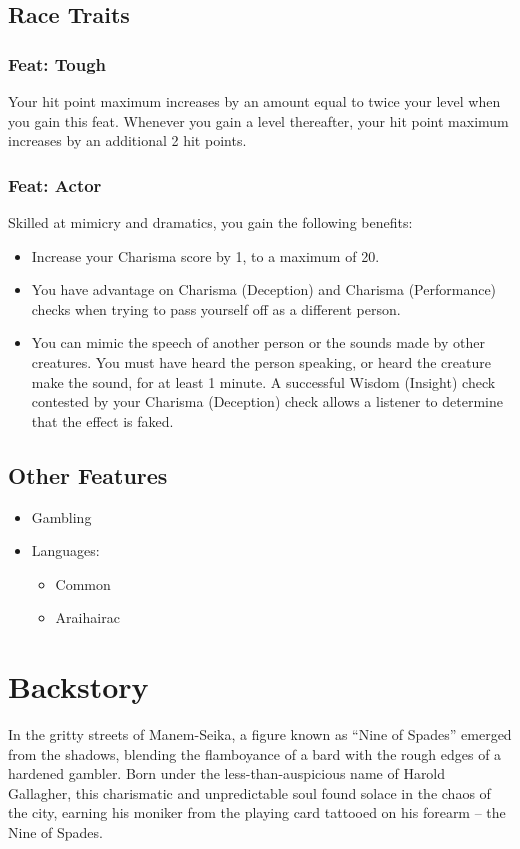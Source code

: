 \documentclass[11pt]{article}
\begin{document}
\subsection{Race Traits}
\label{sec:orgefaa30c}
\subsubsection{Feat: Tough}
\label{sec:orga66f1a5}
Your hit point maximum increases by an amount equal to twice your level when you gain this feat. Whenever you gain a level thereafter, your hit point maximum increases by an additional 2 hit points.
\subsubsection{Feat: Actor}
\label{sec:org3b11506}
Skilled at mimicry and dramatics, you gain the following benefits:
\begin{itemize}
\item Increase your Charisma score by 1, to a maximum of 20.
\item You have advantage on Charisma (Deception) and Charisma (Performance) checks when trying to pass yourself off as a different person.
\item You can mimic the speech of another person or the sounds made by other creatures. You must have heard the person speaking, or heard the creature make the sound, for at least 1 minute. A successful Wisdom (Insight) check contested by your Charisma (Deception) check allows a listener to determine that the effect is faked.
\end{itemize}
\subsection{Other Features}
\label{sec:org3cd41db}
\begin{itemize}
\item Gambling
\item Languages:
\begin{itemize}
\item Common
\item Araihairac
\end{itemize}
\end{itemize}
\section{Backstory}
\label{sec:orgc68cc7e}
In the gritty streets of Manem-Seika, a figure known as ``Nine of Spades'' emerged from the shadows, blending the flamboyance of a bard with the rough edges of a hardened gambler. Born under the less-than-auspicious name of Harold Gallagher, this charismatic and unpredictable soul found solace in the chaos of the city, earning his moniker from the playing card tattooed on his forearm – the Nine of Spades.
\end{document}
